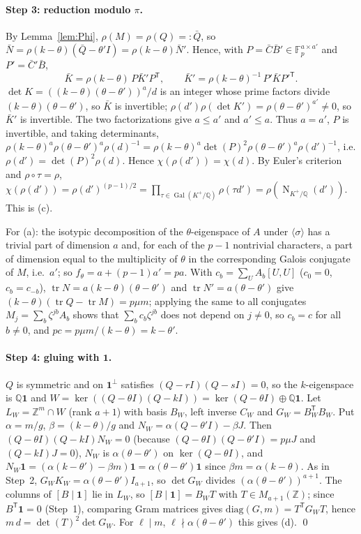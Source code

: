 \documentclass[11pt,a4paper]{article}
\theoremstyle{remark}
\newcommand{\Z}{\mathbb{Z}}
\newcommand{\Q}{\mathbb{Q}}
\newcommand{\F}{\mathbb{F}}
\newcommand{\one}{\mathbf{1}}
\newcommand{\Nm}{\operatorname{N}}
\begin{document}
\paragraph{Step 3: reduction modulo $\pi$.} By Lemma~\ref{lem:Phi}, $\rho(M)=\rho(Q)=:\bar Q$, so $\bar N=\rho(k-\theta)(\bar Q-\theta'I)=
\rho(k-\theta)\bar N'$. Hence, with $P=\bar C\bar B'\in\F_p^{a\times a'}$ and $P'=\bar C'\bar B$,
\[
\bar K=\rho(k-\theta)\,P\bar K'P^{\mathsf T},\qquad \bar K'=\rho(k-\theta)^{-1}\,P'\bar KP'^{\mathsf T}.
\]
$\det K=((k-\theta)(\theta-\theta'))^a/d$ is an integer whose prime factors divide $(k-\theta)(\theta-\theta')$, so $\bar K$ is
invertible; $\rho(d')\rho(\det K')=\rho(\theta-\theta')^{a'}\neq0$, so $\bar K'$ is invertible. The two factorizations give
$a\le a'$ and $a'\le a$. Thus $a=a'$, $P$ is invertible, and taking determinants,
$\rho(k-\theta)^a\rho(\theta-\theta')^a\rho(d)^{-1}=\rho(k-\theta)^a\det(P)^2\rho(\theta-\theta')^a\rho(d')^{-1}$, i.e.
$\rho(d')=\det(P)^2\rho(d)$. Hence $\chi(\rho(d'))=\chi(d)$. By Euler's criterion and $\rho\circ\tau=\rho$,
$\chi(\rho(d'))=\rho(d')^{(p-1)/2}=\prod_{\tau\in\operatorname{Gal}(K^+/\Q)}\rho(\tau d')=\rho(\Nm_{K^+/\Q}(d'))$. This is (c).

For (a): the isotypic decomposition of the $\theta$-eigenspace of $A$ under $\langle\sigma\rangle$ has a trivial part of
dimension $a$ and, for each of the $p-1$ nontrivial characters, a part of dimension equal to the multiplicity of $\theta$ in the
corresponding Galois conjugate of $M$, i.e.\ $a'$; so $f_\theta=a+(p-1)a'=pa$. With $c_b=\sum_UA_b[U,U]$ ($c_0=0$,
$c_b=c_{-b}$), $\operatorname{tr}N=a(k-\theta)(\theta-\theta')$ and $\operatorname{tr}N'=a(\theta-\theta')$ give
$(k-\theta)(\operatorname{tr}Q-\operatorname{tr}M)=p\mu m$; applying the same to all conjugates $M_j=\sum_b\zeta^{jb}A_b$ shows that
$\sum_b c_b\zeta^{jb}$ does not depend on $j\neq0$, so $c_b=c$ for all $b\neq0$, and $pc=p\mu m/(k-\theta)=k-\theta'$.

\paragraph{Step 4: gluing with $\one$.} $Q$ is symmetric and on $\one^\perp$ satisfies $(Q-rI)(Q-sI)=0$, so the $k$-eigenspace is
$\Q\one$ and $W=\ker((Q-\theta I)(Q-kI))=\ker(Q-\theta I)\oplus\Q\one$. Let $L_W=\Z^m\cap W$ (rank $a+1$) with basis $B_W$, left inverse
$C_W$ and $G_W=B_W^{\mathsf T}B_W$. Put $\alpha=m/g$, $\beta=(k-\theta)/g$ and $N_W=\alpha(Q-\theta'I)-\beta J$. Then
$(Q-\theta I)(Q-kI)N_W=0$ (because $(Q-\theta I)(Q-\theta'I)=p\mu J$ and $(Q-kI)J=0$), $N_W$ is $\alpha(\theta-\theta')$ on
$\ker(Q-\theta I)$, and $N_W\one=(\alpha(k-\theta')-\beta m)\one=\alpha(\theta-\theta')\one$ since $\beta m=\alpha(k-\theta)$. As in
Step~2, $G_WK_W=\alpha(\theta-\theta')I_{a+1}$, so $\det G_W$ divides $(\alpha(\theta-\theta'))^{a+1}$. The columns of $[B\mid\one]$ lie in
$L_W$, so $[B\mid\one]=B_WT$ with $T\in M_{a+1}(\Z)$; since $B^{\mathsf T}\one=0$ (Step~1), comparing Gram matrices gives
$\mathrm{diag}(G,m)=T^{\mathsf T}G_WT$, hence $m\,d=\det(T)^2\det G_W$. For $\ell\mid m$, $\ell\nmid\alpha(\theta-\theta')$ this gives (d).
\qed
\end{document}
